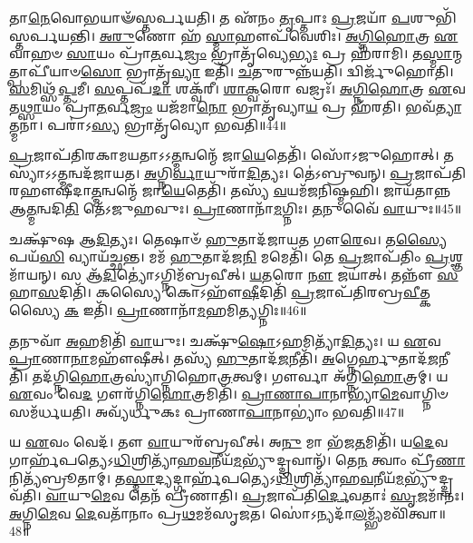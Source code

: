 𑌤𑌾\-\ul{𑌨𑍇}\-𑌵𑍋𑌭𑌯𑌾𑍟᳴𑌸𑍍𑌤𑌰𑍍𑌪𑌯𑌤𑌿।
𑌤 𑌏᳴𑌨𑌂 \ul{𑌤𑍃}\-𑌪𑍍𑌤𑌾𑌃 \ul{𑌪𑍍𑌰}\-𑌜𑌯𑌾᳴ \ul{𑌪}\-𑌶𑍁𑌭𑌿᳴𑌸𑍍𑌤𑌰𑍍𑌪\-𑌯𑌨𑍍𑌤𑌿।
\-\ul{𑌅}\-\-\ul{𑌰𑍁}\-𑌣𑍋 𑌹᳴ \ul{𑌸𑍍𑌮𑌾}\-𑌹𑍗𑌪᳴𑌵𑍇𑌶𑌿𑌃।
\-\ul{𑌅}\-\-\ul{𑌗𑍍𑌨𑌿}\-\-\ul{𑌹𑍋}\-𑌤𑍍𑌰 \ul{𑌏}\-𑌵𑌾𑌹𑍞 \ul{𑌸𑌾}\-𑌯𑌂 𑌪𑍍𑌰𑌾᳴\-\ul{𑌤}\-𑌰𑍍𑌵\-\ul{𑌜𑍍𑌰𑌂} 𑌭𑍍𑌰𑌾𑌤𑍃᳴𑌵𑍍𑌯𑍇\-\ul{𑌭𑍍𑌯𑌃} 𑌪𑍍𑌰 𑌹᳴𑌰𑌾𑌮𑌿।
𑌤\-\ul{𑌸𑍍𑌮𑌾}\-𑌨𑍍𑌮𑌤𑍍𑌪𑌾𑌪𑍀᳴𑌯𑌾𑍞\-\ul{𑌸𑍋} 𑌭𑍍𑌰𑌾𑌤𑍃᳴\-\ul{𑌵𑍍𑌯𑌾} 𑌇𑌤𑌿᳴।
\-\ul{𑌚}\-𑌤𑍁𑌰𑍁𑌨𑍍𑌨᳴𑌯𑌤𑌿।
𑌦𑍍𑌵𑌿𑌰𑍍𑌜𑍁᳴𑌹𑍋𑌤𑌿।
\-\ul{𑌸}\-𑌮𑌿𑌥𑍍𑌸᳴\-\ul{𑌪𑍍𑌤}\-𑌮𑍀।
\-\ul{𑌸}\-𑌪𑍍𑌤𑌪᳴\-\ul{𑌦𑌾} 𑌶𑌕𑍍𑌵᳴𑌰𑍀।
\-\ul{𑌶𑌾}\-\-\ul{𑌕𑍍𑌵}\-𑌰𑍋 𑌵𑌜𑍍𑌰𑌃᳴।
\-\ul{𑌅}\-\-\ul{𑌗𑍍𑌨𑌿}\-\-\ul{𑌹𑍋}\-𑌤𑍍𑌰 \ul{𑌏}\-𑌵 𑌤\-\ul{𑌥𑍍𑌸𑌾}\-𑌯𑌂 𑌪𑍍𑌰𑌾᳴\-\ul{𑌤}\-𑌰𑍍𑌵\-\ul{𑌜𑍍𑌰𑌂} 𑌯𑌜᳴𑌮𑌾\-\ul{𑌨𑍋} 𑌭𑍍𑌰𑌾𑌤𑍃᳴𑌵𑍍𑌯𑌾\-\ul{𑌯} 𑌪𑍍𑌰 𑌹᳴𑌰𑌤𑌿।
𑌭𑌵᳴\-\ul{𑌤𑍍𑌯𑌾}\-𑌤𑍍𑌮𑌨𑌾॑।
𑌪𑌰𑌾॑𑌽\-\ul{𑌸𑍍𑌯} 𑌭𑍍𑌰𑌾𑌤𑍃᳴𑌵𑍍𑌯𑍋 𑌭𑌵𑌤𑌿॥44॥\anuvakamend[\-\ul{𑌬}\-\-\ul{𑌰𑍍}\-𑌹𑌿𑌃 \ul{𑌪𑍍𑌰𑌾}\-𑌤𑌰𑍍\mbox{}\-\ul{𑌹𑍁}\-𑌤𑌾𑌦𑍍𑌯𑌾᳴𑌯 𑌜𑌾𑌯𑌤𑍇 𑌰𑍁𑌨𑍍𑌧𑍇\-𑌽\-\ul{𑌸𑌾}\-𑌮𑌾 𑌕᳴𑌰𑍋\-\ul{𑌤𑍍𑌯𑍇}\-𑌤𑌾 𑌵𑌾 𑌅᳴𑌗𑍍𑌨𑌿\-\ul{𑌹𑍋}\-𑌤𑍍𑌰𑌸𑍍𑌯𑍋᳴\-\ul{𑌪}\-𑌸𑌦𑍋᳴ 𑌵𑌷\-\ul{𑌟𑍍𑌕𑌾}\-𑌰𑌶𑍍𑌚᳴ 𑌪𑍍𑌰𑌾\-\ul{𑌤}\-𑌰𑍍𑌯𑌾𑌵𑌾᳴\-\ul{𑌣𑍋} 𑌵\-\ul{𑌜𑍍𑌰}\-𑌸𑍍𑌤𑍍𑌰𑍀𑌣𑌿᳴ 𑌚]

\-\ul{𑌪𑍍𑌰}\-𑌜𑌾𑌪᳴𑌤𑌿𑌰𑌕𑌾𑌮𑌯𑌤𑌾\-𑌽𑌽\-\ul{𑌤𑍍𑌮}\-𑌨𑍍𑌵𑌨𑍍𑌮𑍇᳴ 𑌜𑌾\-\ul{𑌯𑍇}\-𑌤𑍇𑌤𑌿᳴।
𑌸𑍋᳴𑌽𑌜𑍁𑌹𑍋𑌤𑍍।
𑌤𑌸𑍍𑌯𑌾॑\-𑌽𑌽\-\ul{𑌤𑍍𑌮}\-𑌨𑍍𑌵𑌦᳴𑌜𑌾𑌯𑌤।
\-\ul{𑌅}\-𑌗𑍍𑌨𑌿\-\ul{𑌰𑍍𑌵𑌾}\-𑌯𑍁𑌰𑌾᳴\-\ul{𑌦𑌿}\-𑌤𑍍𑌯𑌃।
𑌤𑍇॑𑌽𑌬𑍍𑌰𑍁𑌵𑌨𑍍।
\-\ul{𑌪𑍍𑌰}\-𑌜𑌾𑌪᳴𑌤𑌿𑌰\-𑌹𑍗𑌷𑍀\-𑌦𑌾\-\ul{𑌤𑍍𑌮}\-𑌨𑍍𑌵𑌨𑍍𑌮𑍇᳴ 𑌜𑌾\-\ul{𑌯𑍇}\-𑌤𑍇𑌤𑌿᳴।
𑌤𑌸𑍍𑌯᳴ \ul{𑌵}\-𑌯𑌮᳴𑌜𑌨𑌿𑌷𑍍𑌮𑌹𑌿।
𑌜𑌾𑌯᳴𑌤𑌾𑌨𑍍𑌨 𑌆\-\ul{𑌤𑍍𑌮}\-𑌨𑍍𑌵𑌦𑌿\-\ul{𑌤𑌿} 𑌤𑍇᳴\-𑌽𑌜𑍁𑌹𑌵𑍁𑌃।
\-\ul{𑌪𑍍𑌰𑌾}\-𑌣𑌾𑌨𑌾᳴\-\ul{𑌮}\-𑌗𑍍𑌨𑌿𑌃।
\-\ul{𑌤}\-𑌨𑍁𑌵𑍈᳴ \ul{𑌵𑌾}\-𑌯𑍁𑌃॥45॥

𑌚𑌕𑍍𑌷𑍁᳴𑌷 𑌆\-\ul{𑌦𑌿}\-𑌤𑍍𑌯𑌃।
𑌤𑍇𑌷𑌾𑍞᳴ \ul{𑌹𑍁}\-𑌤𑌾𑌦᳴𑌜𑌾𑌯\-\ul{𑌤} 𑌗𑍗\-\ul{𑌰𑍇}\-𑌵।
𑌤\-\ul{𑌸𑍍𑌯𑍈} 𑌪𑌯᳴\-\ul{𑌸𑌿} 𑌵𑍍𑌯𑌾𑌯᳴𑌚𑍍𑌛𑌨𑍍𑌤।
𑌮𑌮᳴ \ul{𑌹𑍁}\-𑌤𑌾𑌦᳴𑌜\-\ul{𑌨𑌿} 𑌮𑌮𑍇𑌤𑌿᳴।
𑌤𑍇 \ul{𑌪𑍍𑌰}\-𑌜𑌾𑌪᳴𑌤𑌿𑌂 \ul{𑌪𑍍𑌰}\-𑌶𑍍𑌞𑌮𑌾᳴𑌯𑌨𑍍।
𑌸 𑌆᳴\-\ul{𑌦𑌿}\-𑌤𑍍𑌯𑍋॑\-𑌽𑌗𑍍𑌨𑌿𑌮᳴𑌬𑍍𑌰𑌵𑍀𑌤𑍍।
\-\ul{𑌯}\-\-\ul{𑌤}\-𑌰𑍋 \ul{𑌨𑍗} 𑌜𑌯𑌾॑𑌤𑍍।
𑌤𑌨𑍍𑌨𑍗᳴ \ul{𑌸}\-𑌹𑌾\-\ul{𑌸}\-𑌦𑌿𑌤𑌿᳴।
𑌕𑌸𑍍𑌯𑍈 𑌕𑍋𑌽𑌹𑍗᳴\-\ul{𑌷𑍀}\-𑌦𑌿𑌤𑌿᳴ \ul{𑌪𑍍𑌰}\-𑌜𑌾𑌪᳴𑌤𑌿𑌰𑌬𑍍𑌰\-\ul{𑌵𑍀}\-𑌤𑍍𑌕𑌸𑍍𑌯𑍈 \ul{𑌕} 𑌇𑌤𑌿᳴।
\-\ul{𑌪𑍍𑌰𑌾}\-𑌣𑌾𑌨𑌾᳴\-\ul{𑌮}\-𑌹𑌮𑌿\-\ul{𑌤𑍍𑌯}\-𑌗𑍍𑌨𑌿𑌃॥46॥

\-\ul{𑌤}\-𑌨𑍁𑌵𑌾᳴ \ul{𑌅}\-𑌹𑌮𑌿𑌤𑌿᳴ \ul{𑌵𑌾}\-𑌯𑍁𑌃।
𑌚𑌕𑍍𑌷𑍁᳴\-\ul{𑌷𑍋}\-\-𑌽𑌹𑌮𑌿𑌤𑍍𑌯𑌾᳴\-\ul{𑌦𑌿}\-𑌤𑍍𑌯𑌃।
𑌯 \ul{𑌏}\-𑌵 \ul{𑌪𑍍𑌰𑌾}\-𑌣𑌾\-\ul{𑌨𑌾}\-𑌮𑌹𑍗᳴𑌷𑍀𑌤𑍍।
𑌤𑌸𑍍𑌯᳴ \ul{𑌹𑍁}\-𑌤𑌾𑌦᳴\-\ul{𑌜}\-𑌨𑍀𑌤𑌿᳴।
\-\ul{𑌅}\-𑌗𑍍𑌨𑍇𑌰𑍍\mbox{}\-\ul{𑌹𑍁}\-𑌤𑌾𑌦᳴\-\ul{𑌜}\-𑌨𑍀𑌤𑌿᳴।
𑌤𑌦᳴𑌗𑍍𑌨𑌿\-\ul{𑌹𑍋}\-𑌤𑍍𑌰𑌸𑍍𑌯𑌾॑𑌗𑍍𑌨𑌿𑌹𑍋\-\ul{𑌤𑍍𑌰}\-𑌤𑍍𑌵𑌮𑍍।
𑌗𑍗𑌰𑍍𑌵𑌾 𑌅᳴𑌗𑍍𑌨𑌿\-\ul{𑌹𑍋}\-𑌤𑍍𑌰𑌮𑍍।
𑌯 \ul{𑌏}\-𑌵𑌂 𑌵𑍇\-\ul{𑌦} 𑌗𑍗𑌰᳴𑌗𑍍𑌨𑌿\-\ul{𑌹𑍋}\-𑌤𑍍𑌰𑌮𑌿𑌤𑌿᳴।
\-\ul{𑌪𑍍𑌰𑌾}\-\-\ul{𑌣𑌾}\-\-\ul{𑌪𑌾}\-𑌨𑌾𑌭𑍍𑌯𑌾᳴\-\ul{𑌮𑍇}\-𑌵𑌾𑌗𑍍𑌨𑌿𑍞 𑌸𑌮᳴𑌰𑍍𑌧𑌯𑌤𑌿।
𑌅𑌵𑍍𑌯᳴𑌰𑍍𑌧𑍁𑌕𑌃 𑌪𑍍𑌰𑌾𑌣𑌾\-\ul{𑌪𑌾}\-𑌨𑌾𑌭𑍍𑌯𑌾𑌂॑ 𑌭𑌵𑌤𑌿॥47॥

𑌯 \ul{𑌏}\-𑌵𑌂 𑌵𑍇𑌦᳴।
𑌤𑍗 \ul{𑌵𑌾}\-𑌯𑍁𑌰᳴𑌬𑍍𑌰𑌵𑍀𑌤𑍍।
𑌅\-\ul{𑌨𑍁} 𑌮𑌾 𑌭᳴𑌜\-\ul{𑌤}\-𑌮𑌿𑌤𑌿᳴।
𑌯\-\ul{𑌦𑍇}\-𑌵 𑌗𑌾𑌰𑍍\mbox{}𑌹᳴𑌪𑌤𑍍𑌯𑍇\-𑌽\-\ul{𑌧𑌿}\-𑌶𑍍𑌰𑌿𑌤𑍍𑌯𑌾᳴𑌹\-\ul{𑌵}\-𑌨𑍀𑌯᳴\-\ul{𑌮}\-𑌭𑍍𑌯𑍁᳴𑌦𑍍𑌦𑍍𑌰𑌵𑌾𑌨𑍍᳴।
𑌤𑍇\-\ul{𑌨} 𑌤𑍍𑌵𑌾𑌂 𑌪𑍍𑌰𑍀᳴\-\ul{𑌣𑌾}\-𑌨𑌿𑌤𑍍𑌯᳴𑌬𑍍𑌰𑍂𑌤𑌾𑌮𑍍।
𑌤\-\ul{𑌸𑍍𑌮𑌾}\-𑌦𑍍𑌯𑌦𑍍𑌗𑌾𑌰𑍍\mbox{}𑌹᳴𑌪𑌤𑍍𑌯𑍇\-𑌽\-\ul{𑌧𑌿}\-𑌶𑍍𑌰𑌿𑌤𑍍𑌯𑌾᳴𑌹\-\ul{𑌵}\-𑌨𑍀𑌯᳴\-\-\ul{𑌮}\-𑌭𑍍𑌯𑍁᳴𑌦𑍍𑌦𑍍𑌰𑌵᳴𑌤𑌿।
\-\ul{𑌵𑌾}\-𑌯𑍁\-\ul{𑌮𑍇}\-𑌵 𑌤𑍇𑌨᳴ 𑌪𑍍𑌰𑍀𑌣𑌾𑌤𑌿।
\-\ul{𑌪𑍍𑌰}\-𑌜𑌾𑌪᳴𑌤𑌿\-\ul{𑌰𑍍𑌦𑍇}\-𑌵𑌤𑌾𑌃॑ \ul{𑌸𑍃}\-𑌜𑌮𑌾᳴𑌨𑌃।
\-\ul{𑌅}\-𑌗𑍍𑌨𑌿\-\ul{𑌮𑍇}\-𑌵 \ul{𑌦𑍇}\-𑌵𑌤𑌾᳴𑌨𑌾𑌂 𑌪𑍍𑌰\-\ul{𑌥}\-𑌮𑌮᳴\-𑌸𑍃𑌜𑌤।
𑌸𑍋॑𑌽𑌨𑍍𑌯𑌦𑌾᳴\-\-\ul{𑌲}\-𑌮𑍍𑌭𑍍𑌯᳴𑌮𑌵𑌿᳴𑌤𑍍𑌵𑌾॥48॥

